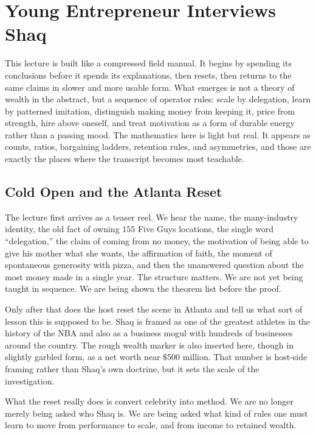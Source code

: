 \chapter{Young Entrepreneur Interviews Shaq}

This lecture is built like a compressed field manual. It begins by spending its conclusions before it spends its explanations, then resets, then returns to the same claims in slower and more usable form. What emerges is not a theory of wealth in the abstract, but a sequence of operator rules: scale by delegation, learn by patterned imitation, distinguish making money from keeping it, price from strength, hire above oneself, and treat motivation as a form of durable energy rather than a passing mood. The mathematics here is light but real. It appears as counts, ratios, bargaining ladders, retention rules, and asymmetries, and those are exactly the places where the transcript becomes most teachable.

\section{Cold Open and the Atlanta Reset}

The lecture first arrives as a teaser reel. We hear the name, the many-industry identity, the old fact of owning \(155\) Five Guys locations, the single word ``delegation,'' the claim of coming from no money, the motivation of being able to give his mother what she wants, the affirmation of faith, the moment of spontaneous generosity with pizza, and then the unanswered question about the most money made in a single year. The structure matters. We are not yet being taught in sequence. We are being shown the theorem list before the proof.

Only after that does the host reset the scene in Atlanta and tell us what sort of lesson this is supposed to be. Shaq is framed as one of the greatest athletes in the history of the NBA and also as a business mogul with hundreds of businesses around the country. The rough wealth marker is also inserted here, though in slightly garbled form, as a net worth near \(\text{\$}500\) million. That number is host-side framing rather than Shaq's own doctrine, but it sets the scale of the investigation.

What the reset really does is convert celebrity into method. We are no longer merely being asked who Shaq is. We are being asked what kind of rules one must learn to move from performance to scale, and from income to retained wealth.


